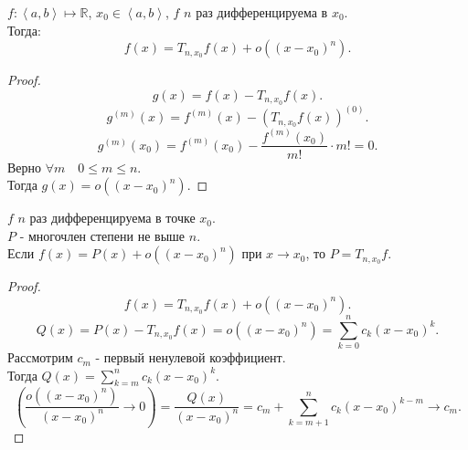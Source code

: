 \documentclass[11pt, oneside]{article}   	%
\begin{document}
    \begin{theorem}
        $f: \left<a, b\right> \mapsto  \mathbb{R}$, $x_0\in \left<a, b\right>$, $f$  $n$ раз дифференцируема в $x_0$.\\
        Тогда:
        \[ f(x) = T_{n, x_0}f(x) + o((x-x_0)^{n}) .\]
        \begin{proof}
            \[ g(x) = f(x) - T_{n, x_0}f(x) .\]
            \[ g^{(m)}(x) = f^{(m)}(x) - (T_{n, x_0}f(x))^{(0)}.\]
            \[ g^{(m)}(x_0) = f^{(m)}(x_0) - \frac{f^{(m)}(x_0)}{m!} \cdot m! = 0 .\]
            Верно $\forall{m}\quad 0 \le m \le n$.\\
            Тогда $g(x) = o((x-x_0)^{n})$.
        \end{proof}
    \end{theorem}
    \begin{tlemma}
        $f$  $n$ раз дифференцируема в точке $x_0$.\\
        $P$ - многочлен степени не выше $n$.\\
        Если $f(x) = P(x) + o((x-x_0)^{n})$ при $x\to x_0$, то $P = T_{n, x_0}f$.
        \begin{proof}
            \[ f(x) = T_{n, x_0}f(x) + o((x-x_0)^{n}) .\]
            \[ Q(x) = P(x) - T_{n, x_0}f(x) = o((x-x_0)^{n}) = \sum\limits_{k=0}^{n} c_k(x-x_0)^{k}.\]
            Рассмотрим $c_m$ - первый ненулевой коэффициент.\\
            Тогда $Q(x) = \sum\limits_{k=m}^{n}c_k(x-x_0)^{k}$.
            \[ \left(\frac{o((x-x_0)^{n})}{(x-x_0)^{n}} \to 0\right) = \frac{Q(x)}{(x-x_0)^{n}} = c_m + \sum\limits_{k=m+1}^{n}c_k(x-x_0)^{k-m} \to c_m .\] 
        \end{proof}
    \end{tlemma}
\end{document}
